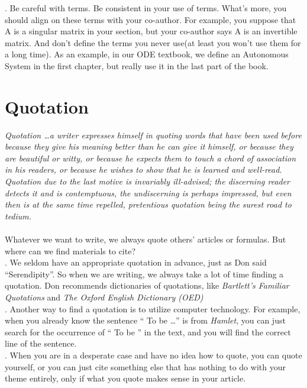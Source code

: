 \documentclass[12pt,a4paper]{article}  %
\theoremstyle{definition}
\numberwithin{equation}{section}
\begin{document}
. Be careful with terms. Be consistent in your use of terms. What's more, you should align on these terms with your co-author. For example, you suppose that A is a singular matrix in your section, but your co-author says A is an invertible matrix. And don't define the terms you never use(at least you won't use them for a long time). As an example, in our ODE textbook, we define an Autonomous System in the first chapter, but really use it in the last part of the book.\\

\section{Quotation}
\textit{Quotation \dots a writer expresses himself in quoting words that have been used before because they give his meaning better than he can give it himself, or because
	they are beautiful or witty, or because he expects them to touch a chord of
	association in his readers, or because he wishes to show that he is learned and
	well-read. Quotation due to the last motive is invariably ill-advised; the discerning
	reader detects it and is contemptuous, the undiscerning is perhaps impressed, but
	even then is at the same time repelled, pretentious quotation being the surest road
	to tedium.}\\ \\ 


\noindent Whatever we want to write, we always quote others' articles or formulas. But where can we find materials to cite?\\  

. We seldom have an appropriate quotation in advance, just as Don said ``Serendipity''. So when we are writing, we always take a lot of time finding a quotation. Don recommends dictionaries of quotations, like \textit{Bartlett's Familiar Quotations} and \textit{The Oxford English Dictionary (OED)}\\

. Another way to find a quotation is to utilize computer technology. For example, when you already know the sentence `` To be \dots'' is from \textit{Hamlet}, you can just search for the occurrence of `` To be '' in the text, and you will find the correct line of the sentence.\\

. When you are in a desperate case and have no idea how to quote, you can quote yourself, or you can just cite something else that has nothing to do with your theme entirely, only if what you quote makes sense in your article.  \\
\end{document}
